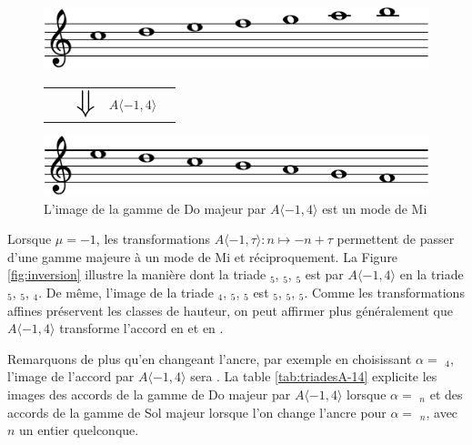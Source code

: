 \begin{figure}
  \includegraphics[width=\columnwidth]{c-maj-crop.pdf}
  \begin{tabularx}{\columnwidth}{ YYYYZ }
    &&$ \mathlarger{\mathlarger{\mathlarger{\mathlarger{\mathlarger{\mathlarger\Downarrow}}}}} $ & $A\langle -1,4 \rangle$&
    \end{tabularx}
  \includegraphics[width=\columnwidth]{e-mod-crop.pdf}
  \caption{L'image de la gamme de Do majeur par $A\langle -1,4 \rangle$ est un mode de Mi}
\end{figure}

Lorsque $\mu = -1$, les transformations $A \langle -1,\tau\rangle : n\mapsto -n + \tau$ permettent de passer d'une gamme majeure à un mode de Mi et réciproquement. La Figure \ref{fig:inversion} illustre la manière dont la triade $_5$, $_5$, $_5$ est  par $A\langle -1,4 \rangle$ en la triade $_5$, $_5$, $_4$. De même, l'image de la triade $_4$, $_5$, $_5$  est  $_5$, $_5$, $_5$. Comme les transformations affines préservent les classes de hauteur, on peut affirmer plus généralement que $A \langle -1,4\rangle$ transforme l'accord  en    et  en . 

Remarquons de plus qu'en changeant l'ancre, par exemple en choisissant $\alpha =$  $_4$, l'image de l'accord  par $A\langle-1,4 \rangle$ sera . La table \ref{tab:triadesA-14} explicite les images des accords de la gamme de Do majeur par $A\langle -1,4 \rangle$ lorsque $\alpha = $ $_n$ et des accords de la gamme de Sol majeur lorsque l'on change l'ancre pour $\alpha =$ $_n$, avec $n$ un entier quelconque.


